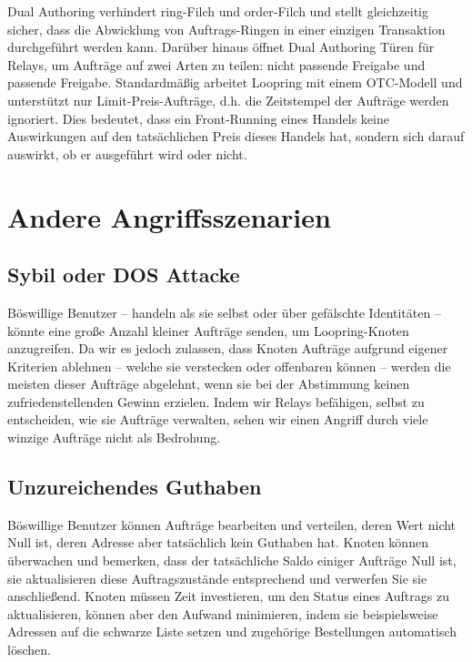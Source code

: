 \documentclass[UTF8,nofonts]{article}
\begin{document}
\begin{multicols}{2}
\begin{itemize}
\end{itemize}

Dual Authoring verhindert ring-Filch und order-Filch und stellt gleichzeitig sicher, dass die Abwicklung von Auftrags-Ringen in einer einzigen Transaktion durchgeführt werden kann. Darüber hinaus öffnet Dual Authoring Türen für Relays, um Aufträge auf zwei Arten zu teilen: nicht passende Freigabe und passende Freigabe. Standardmäßig arbeitet Loopring mit einem OTC-Modell und unterstützt nur Limit-Preis-Aufträge, d.h. die Zeitstempel der Aufträge werden ignoriert. Dies bedeutet, dass ein Front-Running eines Handels keine Auswirkungen auf den tatsächlichen Preis dieses Handels hat, sondern sich darauf auswirkt, ob er ausgeführt wird oder nicht. 

\section{Andere Angriffsszenarien}

\subsection{Sybil oder DOS Attacke}
Böswillige Benutzer -- handeln als sie selbst oder über gefälschte Identitäten -- könnte eine große Anzahl kleiner Aufträge senden, um Loopring-Knoten anzugreifen. Da wir es jedoch zulassen, dass Knoten Aufträge aufgrund eigener Kriterien ablehnen -- welche sie verstecken oder offenbaren können -- werden die meisten dieser Aufträge abgelehnt, wenn sie bei der Abstimmung keinen zufriedenstellenden Gewinn erzielen. Indem wir Relays befähigen, selbst zu entscheiden, wie sie Aufträge verwalten, sehen wir einen Angriff durch viele winzige Aufträge nicht als Bedrohung.

\subsection{Unzureichendes Guthaben}
Böswillige Benutzer können Aufträge bearbeiten und verteilen, deren Wert nicht Null ist, deren Adresse aber tatsächlich kein Guthaben hat. Knoten können überwachen und bemerken, dass der tatsächliche Saldo einiger Aufträge Null ist, sie aktualisieren diese Auftragszustände entsprechend und verwerfen Sie sie anschließend.
Knoten müssen Zeit investieren, um den Status eines Auftrags zu aktualisieren, können aber den Aufwand minimieren, indem sie beispielsweise Adressen auf die schwarze Liste setzen und zugehörige Bestellungen automatisch löschen.


\end{multicols}
\end{document}

